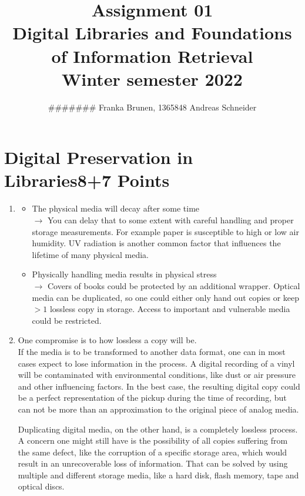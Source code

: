 \documentclass[10pt,a4paper]{article}
\title{ \vspace{-3em}
        Assignment 01\\
		\small{\bf Digital Libraries and Foundations of Information Retrieval}\\
		\small{Winter semester 2022}}
\author{\small{\#\#\#\#\#\#\# Franka Brunen}, \small{1365848 Andreas Schneider}}
\date{}
\begin{document}
\setlength{\parskip}{6pt} %
\setlength{\parindent}{0pt}

\leftskip=1cm\rightskip=0.5cm %

\maketitle

\section{\hfill Digital Preservation in Libraries\hfill 8+7 Points}
\begin{enumerate}
    \item \begin{itemize}
        \item The physical media will decay after some time\\
            $\rightarrow$ You can delay that to some extent with careful handling and proper storage measurements. For example paper is susceptible to high or low air humidity. UV radiation is another common factor that influences the lifetime of many physical media.
        \item Physically handling media results in physical stress\\
            $\rightarrow$ Covers of books could be protected by an additional wrapper. Optical media can be duplicated, so one could either only hand out copies or keep $>1$ lossless copy in storage. Access to important and vulnerable media could be restricted.
    \end{itemize}
    
    \item One compromise is to how lossless a copy will be.\\
    If the media is to be transformed to another data format, one can in most cases expect to lose information in the process. A digital recording of a vinyl will be contaminated with environmental conditions, like dust or air pressure and other influencing factors. In the best case, the resulting digital copy could be a perfect representation of the pickup during the time of recording, but can not be more than an approximation to the original piece of analog media.
    
    Duplicating digital media, on the other hand, is a completely lossless process.\\
    A concern one might still have is the possibility of all copies suffering from the same defect, like the corruption of a specific storage area, which would result in an unrecoverable loss of information. That can be solved by using multiple and different storage media, like a hard disk, flash memory, tape and optical discs.
    

\end{enumerate}
\end{document}
